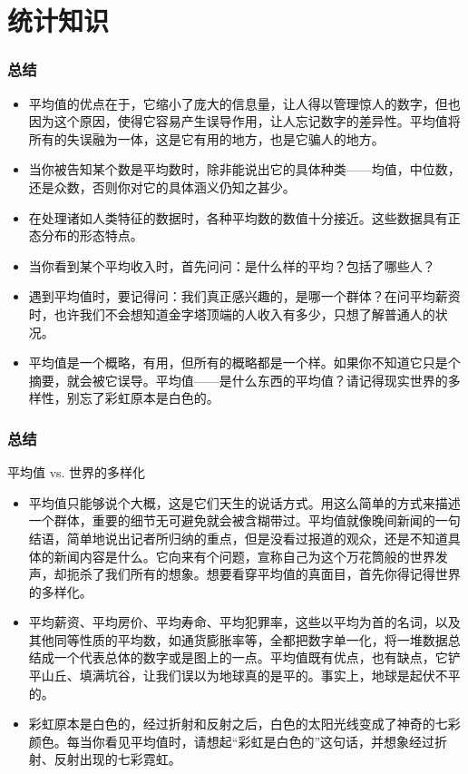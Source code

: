 \section{统计知识}
\begin{frame}
  \frametitle{总结}
  \begin{itemize}
    \item 平均值的优点在于，它缩小了庞大的信息量，让人得以管理惊人的数字，但也因为这个原因，使得它容易产生误导作用，让人忘记数字的差异性。平均值将所有的失误融为一体，这是它有用的地方，也是它骗人的地方。
    \item 当你被告知某个数是平均数时，除非能说出它的具体种类——均值，中位数，还是众数，否则你对它的具体涵义仍知之甚少。
    \item 在处理诸如人类特征的数据时，各种平均数的数值十分接近。这些数据具有正态分布的形态特点。
    \item 当你看到某个平均收入时，首先问问：是什么样的平均？包括了哪些人？
    \item 遇到平均值时，要记得问：我们真正感兴趣的，是哪一个群体？在问平均薪资时，也许我们不会想知道金字塔顶端的人收入有多少，只想了解普通人的状况。
    \item 平均值是一个概略，有用，但所有的概略都是一个样。如果你不知道它只是个摘要，就会被它误导。平均值——是什么东西的平均值？请记得现实世界的多样性，别忘了彩虹原本是白色的。
  \end{itemize}
\end{frame}

\begin{frame}
  \frametitle{总结}
  \begin{block}{平均值 vs. 世界的多样化}
    \begin{itemize}
      \item 平均值只能够说个大概，这是它们天生的说话方式。用这么简单的方式来描述一个群体，重要的细节无可避免就会被含糊带过。平均值就像晚间新闻的一句结语，简单地说出记者所归纳的重点，但是没看过报道的观众，还是不知道具体的新闻内容是什么。它向来有个问题，宣称自己为这个万花筒般的世界发声，却扼杀了我们所有的想象。想要看穿平均值的真面目，首先你得记得世界的多样化。
      \item 平均薪资、平均房价、平均寿命、平均犯罪率，这些以平均为首的名词，以及其他同等性质的平均数，如通货膨胀率等，全都把数字单一化，将一堆数据总结成一个代表总体的数字或是图上的一点。平均值既有优点，也有缺点，它铲平山丘、填满坑谷，让我们误以为地球真的是平的。事实上，地球是起伏不平的。
      \item 彩虹原本是白色的，经过折射和反射之后，白色的太阳光线变成了神奇的七彩颜色。每当你看见平均值时，请想起“彩虹是白色的”这句话，并想象经过折射、反射出现的七彩霓虹。
    \end{itemize}
  \end{block}
\end{frame}




